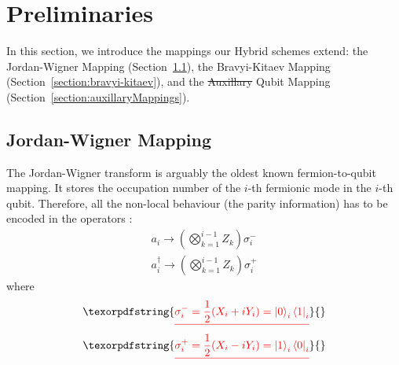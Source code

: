 \documentclass[pdftex,pra,aps,twocolumn,twoside]{revtex4-2}
\theoremstyle{plain}
\theoremstyle{note}
\newcommand\+{{\footnotesize \raisebox{0.3ex}{+}}}
\providecommand{\DIFaddtex}[1]{{\protect\color{blue}\uwave{#1}}} %
\providecommand{\DIFdeltex}[1]{{\protect\color{red}\sout{#1}}}                      %
\providecommand{\DIFaddbegin}{} %
\providecommand{\DIFaddend}{} %
\providecommand{\DIFdelbegin}{} %
\providecommand{\DIFdelend}{} %
\providecommand{\DIFadd}[1]{\texorpdfstring{\DIFaddtex{#1}}{#1}} %
\providecommand{\DIFdel}[1]{\texorpdfstring{\DIFdeltex{#1}}{}} %
\begin{document}
\section{Preliminaries}
 In this section, we introduce the mappings our Hybrid schemes extend: the Jordan-Wigner Mapping (Section~\ref{section:jordan-wigner}), the Bravyi-Kitaev Mapping (Section~\ref{section:bravyi-kitaev}), and the \DIFdelbegin \DIFdel{Auxillary }\DIFdelend \DIFaddbegin \DIFadd{Auxiliary }\DIFaddend Qubit Mapping (Section~\ref{section:auxillaryMappings}).

\subsection{Jordan-Wigner Mapping}
\label{section:jordan-wigner}
The Jordan-Wigner transform \cite{jordan1993paulische} is arguably the oldest known fermion-to-qubit mapping. It stores the occupation number of the $i$-th fermionic mode in the $i$-th qubit. Therefore, all the non-local behaviour (the parity information) has to be encoded in the operators \cite{chiew2021optimal}:
\begin{align}
        a_i \rightarrow \left( \bigotimes_{k=1}^{i-1} Z_k \right) \sigma_i^-\\
        a^{\dagger}_i \rightarrow \left( \bigotimes_{k=1}^{i-1} Z_k \right) \sigma_i^+
\end{align}
where
\DIFdelbegin \begin{align*}
        \DIFdel{\sigma^-_i = \frac{1}{2} (X_i + i Y_i) = \ket{0}_i \bra{1}_i}\\
        \DIFdel{\sigma^+_i = \frac{1}{2} (X_i - i Y_i) = \ket{1}_i \bra{0}_i 
}\end{align*}%
\end{document}
